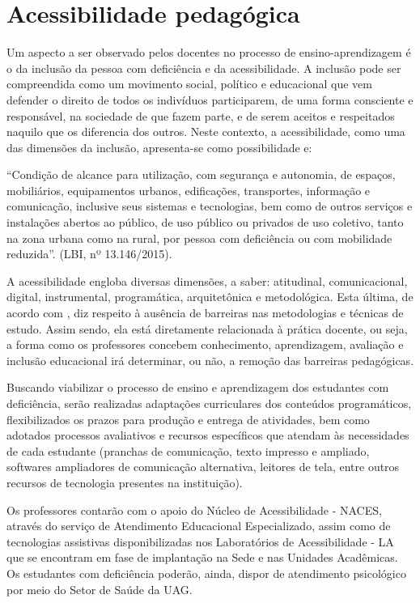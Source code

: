 \documentclass[
	12pt,				%
	openright,			%
  oneside,     %
	a4paper,			%
	chapter=TITLE,		%
	english,			%
	french,				%
	spanish,			%
	brazil				%
	]{abntex2}
\begin{document}
\section{Acessibilidade pedagógica}

Um aspecto a ser observado pelos docentes no processo de ensino-aprendizagem é o da inclusão da pessoa com deficiência e da acessibilidade. A inclusão pode ser compreendida como um movimento social, político e educacional que vem defender o direito de todos os indivíduos participarem, de uma forma consciente e responsável, na sociedade de que fazem parte, e de serem aceitos e respeitados naquilo que os diferencia dos outros. Neste contexto, a acessibilidade, como uma das dimensões da inclusão, apresenta-se como possibilidade e:

\begin{citacao}
    “Condição de alcance para utilização, com segurança e autonomia, de espaços, mobiliários, equipamentos urbanos, edificações, transportes, informação e comunicação, inclusive seus sistemas e tecnologias, bem como de outros serviços e instalações abertos ao público, de uso público ou privados de uso coletivo, tanto na zona urbana como na rural, por pessoa com deficiência ou com mobilidade reduzida”. (LBI, nº 13.146/2015).
\end{citacao}

A acessibilidade engloba diversas dimensões, a saber: atitudinal, comunicacional, digital, instrumental, programática, arquitetônica e metodológica. Esta última, de acordo com , diz respeito à ausência de barreiras nas metodologias e técnicas de estudo. Assim sendo, ela está diretamente relacionada à prática docente, ou seja, a forma como os professores concebem conhecimento, aprendizagem, avaliação e inclusão educacional irá determinar, ou não, a remoção das barreiras pedagógicas.

Buscando viabilizar o processo de ensino e aprendizagem dos estudantes com deficiência, serão realizadas adaptações curriculares dos conteúdos programáticos, flexibilizados os prazos para produção e entrega de atividades, bem como adotados processos avaliativos e recursos específicos que atendam às necessidades de cada estudante (pranchas de comunicação, texto impresso e ampliado, softwares ampliadores de comunicação alternativa, leitores de tela, entre outros recursos de tecnologia presentes na instituição).

Os professores contarão com o apoio do Núcleo de Acessibilidade - NACES, através do serviço de Atendimento Educacional Especializado, assim como de tecnologias assistivas disponibilizadas nos Laboratórios de Acessibilidade - LA que se encontram em fase de implantação na Sede e nas Unidades Acadêmicas. Os estudantes com deficiência poderão, ainda, dispor de atendimento psicológico por meio do Setor de Saúde da UAG.
\end{document}
